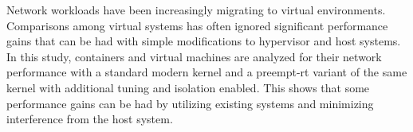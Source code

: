 Network workloads have been increasingly migrating to virtual environments.
Comparisons among virtual systems has often ignored significant performance gains that can be had with simple modifications to hypervisor and host systems.
In this study, containers and virtual machines are analyzed for their network performance with a standard modern kernel and a preempt-rt variant of the same kernel with additional tuning and isolation enabled.  
This shows that some performance gains can be had by utilizing existing systems and minimizing interference from the host system.
